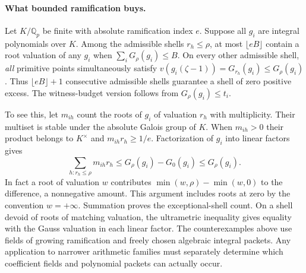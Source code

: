 \paragraph{What bounded ramification buys.}
Let $K/\mathbb Q_p$ be finite with absolute ramification index $e$. Suppose all $g_i$ are integral polynomials over $K$. Among the admissible shells $r_h\le\rho$, at most $\lfloor eB\rfloor$ contain a root valuation of any $g_i$ when $\sum_i G_\rho(g_i)\le B$. On every other admissible shell, \emph{all} primitive points simultaneously satisfy $v(g_i(\zeta-1))=G_{r_h}(g_i)\le G_\rho(g_i)$. Thus $\lfloor eB\rfloor+1$ consecutive admissible shells guarantee a shell of zero positive excess. The witness-budget version follows from $G_\rho(g_i)\le t_i$.

To see this, let $m_{ih}$ count the roots of $g_i$ of valuation $r_h$ with multiplicity. Their multiset is stable under the absolute Galois group of $K$. When $m_{ih}>0$ their product belongs to $K^\times$ and $m_{ih}r_h\ge 1/e$. Factorization of $g_i$ into linear factors gives
\[
 \sum_{h:r_h\le\rho} m_{ih}r_h\le G_\rho(g_i)-G_0(g_i)\le G_\rho(g_i).
\]
In fact a root of valuation $w$ contributes $\min(w,\rho)-\min(w,0)$ to the difference, a nonnegative amount. This argument includes roots at zero by the convention $w=+\infty$. Summation proves the exceptional-shell count. On a shell devoid of roots of matching valuation, the ultrametric inequality gives equality with the Gauss valuation in each linear factor. The counterexamples above use fields of growing ramification and freely chosen algebraic integral packets. Any application to narrower arithmetic families must separately determine which coefficient fields and polynomial packets can actually occur.
